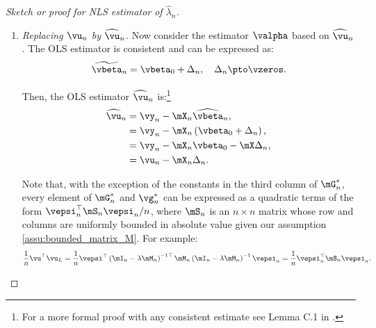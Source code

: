 \documentclass[english,12pt]{book}\usepackage[]{graphicx}\usepackage[]{xcolor}
\begin{document}
\begin{proof}[Sketch or proof for NLS estimator of $\widehat{\lambda}_n$]
\begin{enumerate}
Also:
\begin{equation*}
\begin{aligned}
\plim \vg_n^* &= \plim \mG^*_n\valpha, \\
 & = \mGamma_n\valpha.
 \end{aligned}
\end{equation*}

If $\vu_n$ would be observed, a linear GMM estimator for $\lambda$, say $\widetilde{\lambda}$,  would be the first element of the least squared estimator $\valpha$, namely:
\begin{equation*}
  \widetilde{\valpha}= \mG_n^{-1*}\vg_n^*, 
\end{equation*}
%
since $\mG_n^{*}$ is a $3\times 3$ matrix which is nonsingular. Thus, using our previous results:
\begin{equation}\label{eq:consisten_error_gm}
  \plim \widetilde{\valpha}=\plim \mG_n^{-1*} \plim \vg_n^* = \mGamma_n^{-1}\vgamma_n = \valpha.
\end{equation}

\item \emph{Replacing $\vu_n$ by $\widehat{\vu}_n$}. Now consider the estimator $\valpha$ based on $\widehat{\vu}_n$. The OLS estimator is consistent and can be expressed as:
\begin{equation*}
\widetilde{\vbeta}_n = \vbeta_0 + \Delta_n, \quad \Delta_n\pto \vzeros.
\end{equation*}

Then, the OLS estimator $\widehat{\vu}_n$ is:\footnote{For a more formal proof with any consistent estimate see Lemma C.1 in \cite{kelejian2010specification}.}
\begin{equation*}
\begin{aligned}
\widehat{\vu}_n & = \vy_n - \mX_n\widehat{\vbeta}_n,  \\
              & = \vy_n - \mX_n\left(\vbeta_0 + \Delta_n\right), \\
              & = \vy_n - \mX_n\vbeta_0 - \mX\Delta_n, \\
              & = \vu_n - \mX_n\Delta_n. 
\end{aligned}
\end{equation*}

Note that, with the exception of the constants in the third column of $\mG^*_n$, every element of $\mG^*_n$ and $\vg_n^*$ can be expressed as a quadratic terms of the form $\vepsi^\top_n\mS_n\vepsi_n/n$, where $\mS_n$ is an $n\times n$ matrix whose row and columns are uniformly bounded in absolute value given our assumption \ref{assu:bounded_matrix_M}. For example:
\begin{equation*}
      \frac{1}{n}\vu^\top\vu_L  = \frac{1}{n} \vepsi^{\top}\left(\mI_n - \lambda\mM_n\right)^{-1\top}\mM_n\left(\mI_n - \lambda\mM_n\right)^{-1}\vepsi_n = \frac{1}{n}\vepsi^\top_n\mS_n\vepsi_n.
\end{equation*}


\end{enumerate}
\end{proof}
\end{document}
